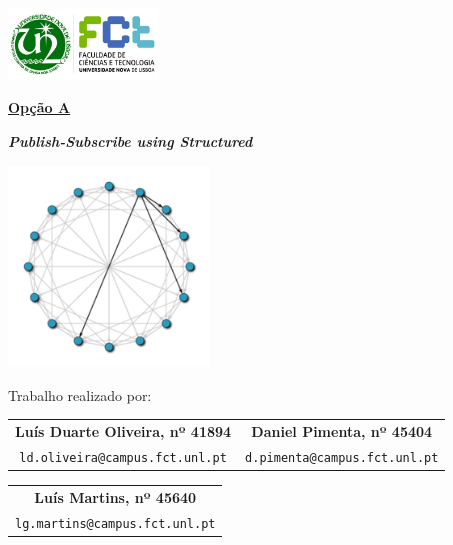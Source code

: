 \documentclass[12pt]{article}
\begin{document}
\begin{titlepage}
    \includegraphics[width=0.3\textwidth]{fctUnlLogo.jpg}
    \begin{center}
        \vspace{0.5cm}

        \begin{Large}
        	\underline{\textbf{Opção A}}\\
        \end{Large}
        
        \textbf{\emph{Publish-Subscribe using Structured}}
               
        \vspace{0.3cm}

		\includegraphics[width=0.4\textwidth]{Chord_network.png}
		
        \vspace{0.3cm}
        
        Trabalho realizado por:
        
        \vspace{0.5cm}

		\begin{table}[htbp]
		\centering
        	\begin{tabular}{c c}
				\textbf{Luís Duarte Oliveira, nº 41894} & \textbf{Daniel Pimenta, nº 45404}\\
				\texttt{ld.oliveira@campus.fct.unl.pt} & \texttt{d.pimenta@campus.fct.unl.pt}\\
			\end{tabular}
		\end{table}
		
		\begin{table}[htbp]
		\centering
        	\begin{tabular}{c}
				\textbf{Luís Martins, nº 45640}\\
				\texttt{lg.martins@campus.fct.unl.pt}\\
			\end{tabular}
		\end{table}
		

\end{center}
\end{titlepage}
\end{document}
